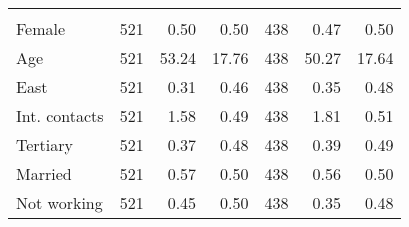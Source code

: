 \begin{table}[H]
\begin{tabular}[t]{lrrrrrr}
\addlinespace[0.3em]
\multicolumn{7}{l}{\textbf{Independent variables}}\\
\hspace{1em}Female & 521 & 0.50 & 0.50 & 438 & 0.47 & 0.50\\
\hspace{1em}Age & 521 & 53.24 & 17.76 & 438 & 50.27 & 17.64\\
\hspace{1em}East & 521 & 0.31 & 0.46 & 438 & 0.35 & 0.48\\
\hspace{1em}Int. contacts & 521 & 1.58 & 0.49 & 438 & 1.81 & 0.51\\
\hspace{1em}Tertiary & 521 & 0.37 & 0.48 & 438 & 0.39 & 0.49\\
\hspace{1em}Married & 521 & 0.57 & 0.50 & 438 & 0.56 & 0.50\\
\hspace{1em}Not working & 521 & 0.45 & 0.50 & 438 & 0.35 & 0.48\\
\bottomrule
\end{tabular}
\end{table}